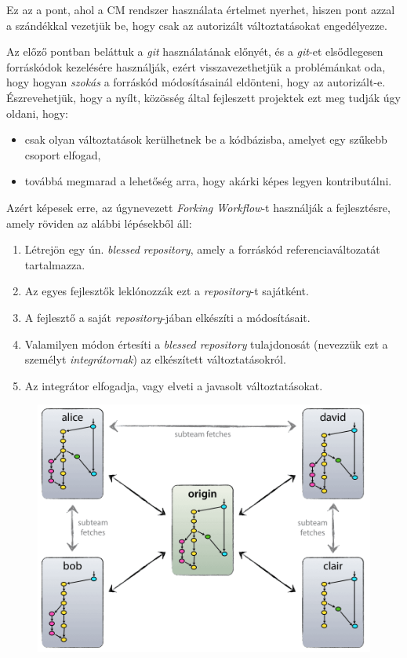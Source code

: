 Ez az a pont, ahol a CM rendszer használata értelmet nyerhet, hiszen pont azzal a szándékkal
vezetjük be, hogy csak az autorizált változtatásokat engedélyezze.

Az előző pontban beláttuk a \emph{git} használatának előnyét, és a \emph{git}-et elsődlegesen
forráskódok kezelésére használják, ezért visszavezethetjük a problémánkat oda, hogy hogyan
\emph{szokás} a forráskód módosításainál eldönteni, hogy az autorizált-e.
Észrevehetjük, hogy a nyílt, közösség által fejleszett projektek ezt meg tudják
úgy oldani, hogy:
\begin{itemize}
    \item{csak olyan változtatások kerülhetnek be a kódbázisba, amelyet egy szűkebb csoport elfogad,}
    \item{továbbá megmarad a lehetőség arra, hogy akárki képes legyen kontributálni.}
\end{itemize}

Azért képesek erre, az úgynevezett \emph{Forking Workflow}-t használják a fejlesztésre, amely röviden
az alábbi lépésekből áll:
\begin{enumerate}
    \item{Létrejön egy ún. \emph{blessed repository}, amely a forráskód referenciaváltozatát
        tartalmazza.}
    \item{Az egyes fejlesztők leklónozzák ezt a \emph{repository}-t sajátként.}
    \item{A fejlesztő a saját \emph{repository}-jában elkészíti a módosításait.}
    \item{Valamilyen módon értesíti a \emph{blessed repository} tulajdonosát
        (nevezzük ezt a személyt \emph{integrátornak}) az elkészített változtatásokról.}
    \item{Az integrátor elfogadja, vagy elveti a javasolt változtatásokat.}
\end{enumerate}

\begin{figure}[h]
    \centering
    \includegraphics[width=\textwidth, height=0.25\textheight, keepaspectratio]{figures/forkingworkflow.png}
\end{figure}
\FloatBarrier

